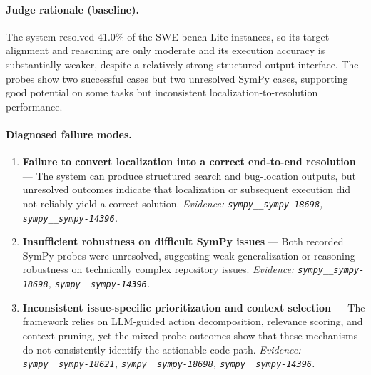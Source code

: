\paragraph{Judge rationale (baseline).}
The system resolved 41.0\% of the SWE-bench Lite instances, so its target alignment and reasoning are only moderate and its execution accuracy is substantially weaker, despite a relatively strong structured-output interface. The probes show two successful cases but two unresolved SymPy cases, supporting good potential on some tasks but inconsistent localization-to-resolution performance.
\paragraph{Diagnosed failure modes.}\begin{enumerate}\itemsep1pt
\item \textbf{Failure to convert localization into a correct end-to-end resolution} --- The system can produce structured search and bug-location outputs, but unresolved outcomes indicate that localization or subsequent execution did not reliably yield a correct solution. \emph{Evidence: \texttt{sympy\_\_sympy-18698}, \texttt{sympy\_\_sympy-14396}.}
\item \textbf{Insufficient robustness on difficult SymPy issues} --- Both recorded SymPy probes were unresolved, suggesting weak generalization or reasoning robustness on technically complex repository issues. \emph{Evidence: \texttt{sympy\_\_sympy-18698}, \texttt{sympy\_\_sympy-14396}.}
\item \textbf{Inconsistent issue-specific prioritization and context selection} --- The framework relies on LLM-guided action decomposition, relevance scoring, and context pruning, yet the mixed probe outcomes show that these mechanisms do not consistently identify the actionable code path. \emph{Evidence: \texttt{sympy\_\_sympy-18621}, \texttt{sympy\_\_sympy-18698}, \texttt{sympy\_\_sympy-14396}.}
\end{enumerate}
